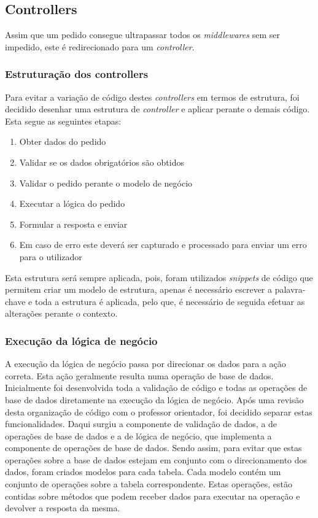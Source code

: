 \subsection{Controllers}
Assim que um pedido consegue ultrapassar todos os \textit{middlewares} sem ser impedido, este é redirecionado para um \textit{controller}.

\subsubsection{Estruturação dos controllers}
Para evitar a variação de código destes \textit{controllers} em termos de estrutura, foi decidido desenhar uma estrutura de \textit{controller} e aplicar perante o demais código. Esta segue as seguintes etapas:
\begin{enumerate}
 \item Obter dados do pedido
 \item Validar se os dados obrigatórios são obtidos
 \item Validar o pedido perante o modelo de negócio
 \item Executar a lógica do pedido
 \item Formular a resposta e enviar
 \item Em caso de erro este deverá ser capturado e processado para enviar um erro para o utilizador
\end{enumerate}

 Esta estrutura será sempre aplicada, pois, foram utilizados \textit{snippets} de código que permitem criar um modelo de estrutura, apenas é necessário escrever a palavra-chave e toda a estrutura é aplicada, pelo que, é necessário de seguida efetuar as alterações perante o contexto.

\subsubsection{Execução da lógica de negócio}
A execução da lógica de negócio passa por direcionar os dados para a ação correta. Esta ação geralmente resulta numa operação de base de dados. Inicialmente foi desenvolvida toda a validação de código e todas as operações de base de dados diretamente na execução da lógica de negócio. Após uma revisão desta organização de código com o professor orientador, foi decidido separar estas funcionalidades. Daqui surgiu a componente de validação de dados, a de operações de base de dados e a de lógica de negócio, que implementa a componente de operações de base de dados. Sendo assim, para evitar que estas operações sobre a base de dados estejam em conjunto com o direcionamento dos dados, foram criados modelos para cada tabela. Cada modelo contém um conjunto de operações sobre a tabela correspondente. Estas operações, estão contidas sobre métodos que podem receber dados para executar na operação e devolver a resposta da mesma.

